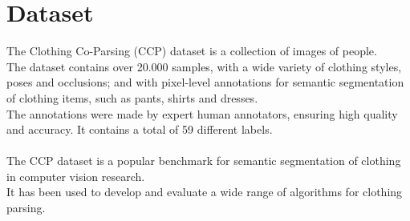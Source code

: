 \documentclass{article}
\begin{document}
\section{Dataset}\label{sec:dataset}
The Clothing Co-Parsing (CCP) dataset is a collection of images of people.\\
The dataset contains over 20.000 samples, with a wide variety of clothing styles, poses and occlusions; and with pixel-level annotations for semantic segmentation of clothing items, such as pants, shirts and dresses.\\ The annotations were made by expert human annotators, ensuring high quality and accuracy.
It contains a total of 59 different labels.\\\\
The CCP dataset is a popular benchmark for semantic segmentation of clothing in computer vision research.\\ It has been used to develop and evaluate a wide range of algorithms for clothing parsing.
\end{document}
